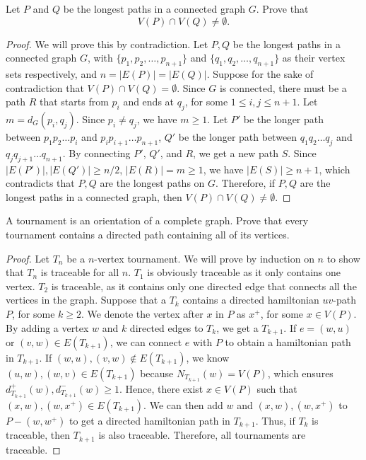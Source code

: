 \documentclass{article}
\newenvironment{problem}[2][Problem]{\begin{trivlist}
\item[\hskip \labelsep {\bfseries #1}\hskip \labelsep {\bfseries #2.}]}{\end{trivlist}}
\begin{document}
\begin{problem}{1.7.14.a}
     Let $P$ and $Q$ be the longest paths in a connected graph $G$. Prove that
     \[V(P) \cap V(Q) \neq \emptyset.\]
\end{problem}
\begin{proof}
    We will prove this by contradiction. Let $P, Q$ be the longest paths in a connected graph $G$, with $\{p_1, p_2, \dots, p_{n+1}\}$ and $\{q_1, q_2, \dots, q_{n+1}\}$ as their vertex sets respectively, and $n = |E(P)| = |E(Q)|$.  Suppose for the sake of contradiction that $V(P) \cap V(Q) = \emptyset$. Since $G$ is connected, there must be a path $R$ that starts from $p_i$ and ends at $q_j$, for some $1 \leq i, j \leq n + 1$. Let $m = d_G(p_i, q_j)$. Since $p_i \neq q_j$, we have $m \geq 1$. Let $P'$ be the longer path between $p_1p_2\dots p_i$ and $p_ip_{i+1}\dots p_{n+1}$, $Q'$ be the longer path between $q_1q_2\dots q_j$ and $q_jq_{j+1}\dots q_{n+1}$. By connecting $P'$, $Q'$, and $R$, we get a new path $S$. Since $|E(P')|, |E(Q')| \geq n/2$, $|E(R)| = m \geq 1$, we have $|E(S)| \geq n + 1$, which contradicts that $P, Q$ are the longest paths on $G$.
    Therefore, if $P, Q$ are the longest paths in a connected graph, then $V(P) \cap V(Q) \neq \emptyset$.
\end{proof}

\begin{problem}{2.5.2}
    A tournament is an orientation of a complete graph. Prove that every tournament contains a directed path containing all of its vertices.
\end{problem}
\begin{proof}
    Let $T_n$ be a $n$-vertex tournament. We will prove by induction on $n$ to show that $T_n$ is traceable for all $n$. $T_1$ is obviously traceable as it only contains one vertex. $T_2$ is traceable, as it contains only one directed edge that connects all the vertices in the graph. Suppose that a $T_k$ contains a directed hamiltonian $uv$-path $P$, for some $k \geq 2$. We denote the vertex after $x$ in $P$ as $x^+$, for some $x \in V(P)$. By adding a vertex $w$ and $k$ directed edges to $T_k$, we get a $T_{k+1}$. If $e = (w, u)$ or $(v, w) \in E(T_{k+1})$, we can connect $e$ with $P$ to obtain a hamiltonian path in $T_{k+1}$. If $(w, u), (v, w) \notin E(T_{k+1})$, we know $(u, w), (w, v) \in E(T_{k+1})$ because $N_{T_{k+1}}(w) = V(P)$, which ensures $d_{T_{k+1}}^+(w), d_{T_{k+1}}^-(w) \geq 1$. Hence, there exist $x \in V(P)$ such that $(x, w), (w, x^+) \in E(T_{k+1})$. We can then add $w$ and $(x, w), (w, x^+)$ to $P - (w, w^+)$ to get a directed hamiltonian path in $T_{k+1}$. Thus, if $T_k$ is traceable, then $T_{k+1}$ is also traceable. Therefore, all tournaments are traceable.
\end{proof}
\end{document}
